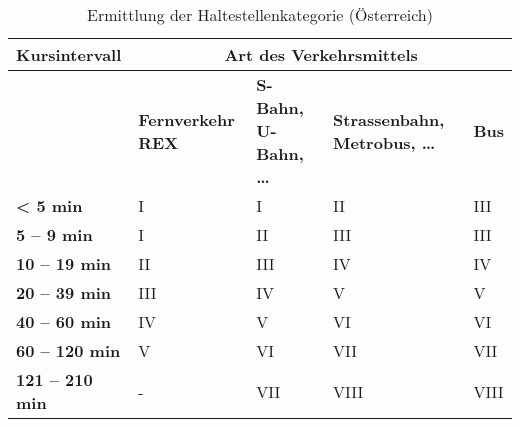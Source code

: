 \begin{table}[ht]
    \begin{tabular}[c]{l p{2.9cm} p{2.8cm} p{2.8cm} p{2.8cm}}
        \toprule
        \textbf{Kursintervall}
                                & \multicolumn{4}{c}{\textbf{Art des Verkehrsmittels}}\\
        \midrule
        \textbf{}
                                & \textbf{Fernverkehr REX}
                                & \textbf{S-Bahn, U-Bahn, \dots}
                                & \textbf{Strassenbahn, Metrobus, \dots}
                                & \textbf{Bus}\\
        \textbf{< 5 min}
                                & I
                                & I
                                & II
                                & \cellcolor{red!25}III\\
        \textbf{5 -- 9 min}
                                & I
                                & II
                                & III
                                & III\\
        \textbf{10 -- 19 min}
                                & II
                                & III
                                & IV
                                & IV\\
        \textbf{20 -- 39 min}
                                & III
                                & IV
                                & \cellcolor{red!25}V
                                & V\\
        \textbf{40 -- 60 min}
                                & \cellcolor{red!25}IV
                                & V
                                & \cellcolor{red!25}VI
                                & VI\\
        \cellcolor{red!25}\textbf{60 -- 120 min}
                                & \cellcolor{red!25}V
                                & \cellcolor{red!25}VI
                                & \cellcolor{red!25}VII
                                & \cellcolor{red!25}VII\\
        \cellcolor{red!25}\textbf{121 -- 210 min}
                                & -
                                & \cellcolor{red!25}VII
                                & \cellcolor{red!25}VIII
                                & \cellcolor{red!25}VIII\\
        \bottomrule
    \end{tabular}
    \caption{Ermittlung der Haltestellenkategorie (Österreich)}
    \label{table:Ermittlung der Haltestellenkategorie (Österreich)}
\end{table}

